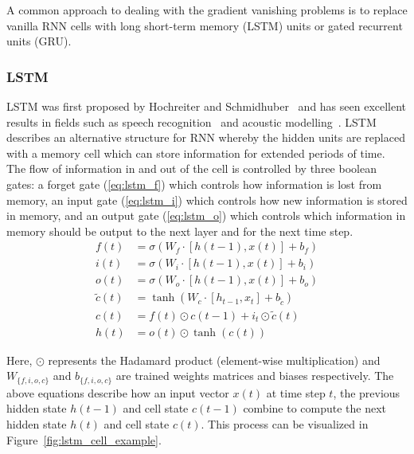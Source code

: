 A common approach to dealing with the gradient vanishing problems is to replace
vanilla RNN cells with long short-term memory (LSTM) units or gated recurrent
units (GRU).

\subsubsection{LSTM}

LSTM was first proposed by Hochreiter and Schmidhuber~\cite{hochreiter1997long}
and has seen excellent results in fields such as speech
recognition~\cite{he2016exploiting} and acoustic
modelling~\cite{qu2017syllable}. LSTM describes an alternative structure for RNN
whereby the hidden units are replaced with a memory cell which can store
information for extended periods of time. The flow of information in and out of
the cell is controlled by three boolean gates: a forget gate (\ref{eq:lstm_f})
which controls how information is lost from memory, an
input gate (\ref{eq:lstm_i}) which controls how new information is stored in
memory, and an output gate (\ref{eq:lstm_o}) which controls which information in
memory should be output to the next layer and for the next time step.
\begin{align}
  f(t) &= \sigma(W_f \cdot \left[ h(t-1),x(t) \right] + b_f) \label{eq:lstm_f} \\[0.5em]
  i(t) &= \sigma(W_i \cdot \left[ h(t-1),x(t) \right] + b_i) \label{eq:lstm_i} \\[0.5em]
  o(t) &= \sigma(W_o \cdot \left[ h(t-1),x(t) \right] + b_o) \label{eq:lstm_o} \\[0.5em]
  \tilde{c}(t) &= \tanh \left( 
    W_c \cdot \left[ h_{t-1},x_t \right] + b_{\tilde{c}}
  \right)\\[0.5em]
  c(t) &= f(t) \odot c(t-1) + i_t \odot \tilde{c}(t) \\[0.5em]
  h(t) &= o(t) \odot \tanh (c(t))
\end{align}

Here, $\odot$ represents the Hadamard product (element-wise multiplication) and
$W_{\{f,i,o,c\}}$ and $b_{\{f,i,o,c\}}$ are trained weights matrices and biases
respectively. The above equations describe how an input vector $x(t)$ at time
step $t$, the previous hidden state $h(t-1)$ and cell state $c(t-1)$ combine to
compute the next hidden state $h(t)$ and cell state $c(t)$. This process can be
visualized in Figure~\ref{fig:lstm_cell_example}.

